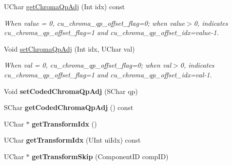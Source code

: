 \begin{DoxyCompactItemize}
\mbox{\label{class_t_com_data_c_u_a2267233e4f81120314abf4aeb6a607bb}} 
U\+Char \hyperlink{class_t_com_data_c_u_a2267233e4f81120314abf4aeb6a607bb}{get\+Chroma\+Qp\+Adj} (Int idx) const
\begin{DoxyCompactList}\small\item\em When value = 0, cu\+\_\+chroma\+\_\+qp\+\_\+offset\+\_\+flag=0; when value$>$0, indicates cu\+\_\+chroma\+\_\+qp\+\_\+offset\+\_\+flag=1 and cu\+\_\+chroma\+\_\+qp\+\_\+offset\+\_\+idx=value-\/1. \end{DoxyCompactList}\item 
\mbox{\label{class_t_com_data_c_u_a4294175c10a769a58e2bb5c29937500f}} 
Void \hyperlink{class_t_com_data_c_u_a4294175c10a769a58e2bb5c29937500f}{set\+Chroma\+Qp\+Adj} (Int idx, U\+Char val)
\begin{DoxyCompactList}\small\item\em When val = 0, cu\+\_\+chroma\+\_\+qp\+\_\+offset\+\_\+flag=0; when val$>$0, indicates cu\+\_\+chroma\+\_\+qp\+\_\+offset\+\_\+flag=1 and cu\+\_\+chroma\+\_\+qp\+\_\+offset\+\_\+idx=val-\/1. \end{DoxyCompactList}\item 
\mbox{\label{class_t_com_data_c_u_a074b651cd8802ac62a62432a415b169a}} 
Void {\bfseries set\+Coded\+Chroma\+Qp\+Adj} (S\+Char qp)
\item 
\mbox{\label{class_t_com_data_c_u_aea335183fbb927d5b6fd091cffc2fba9}} 
S\+Char {\bfseries get\+Coded\+Chroma\+Qp\+Adj} () const
\item 
\mbox{\label{class_t_com_data_c_u_ab4737eb78354f70e860fc11bffd08645}} 
U\+Char $\ast$ {\bfseries get\+Transform\+Idx} ()
\item 
\mbox{\label{class_t_com_data_c_u_abcbaae7e233e6c6d49c270f4b1a58c6e}} 
U\+Char {\bfseries get\+Transform\+Idx} (U\+Int ui\+Idx) const
\item 
\mbox{\label{class_t_com_data_c_u_a11ed3d985e0fbdae1afbec2086f48154}} 
U\+Char $\ast$ {\bfseries get\+Transform\+Skip} (Component\+ID comp\+ID)
\item 
\mbox{\label{class_t_com_data_c_u_a97a7586513dd29f55976358624a8155c}} 

\end{DoxyCompactItemize}
